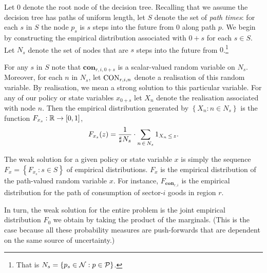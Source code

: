 \documentclass[12pt,a4paper,twoside, draft]{article}
\begin{document}
Let $\mathfrak{0}$ denote the root node of the decision tree.
Recalling that we assume the decision tree has paths of uniform length, let $S$
denote the set of \emph{path times}: for each $s$ in $S$ the node $p_s$ is $s$
steps into the future from $\mathfrak{0}$ along path $p$.
We begin by constructing the empirical distribution associated with
$\mathfrak{0} + s$ for each $s \in S$.
Let $N_s$ denote the set of nodes that are $s$ steps into the future from
$\mathfrak{0}$.\footnote{
   That is $N_{s} = \left\{ p_{s} \in \mathcal N : p \in \mathcal P\right\}$.
}

For any $s$ in $S$ note that $\mathbf{con}_{r, i, \mathfrak{0} + s}$ is a
scalar-valued random variable on $N_s$. 
Moreover, for each $n$ in $N_s$, let $\textup{CON}_{r, i, n}$ denote a
realisation of this random variable.
By realisation, we mean a strong solution to this particular variable.
For any of our policy or state variables $x_{\mathfrak{0}+s}$ let $X_n$ denote
the realisation associated with node $n$.
Then the empirical distribution generated by $\left\{X_n: n \in N_s\right\}$ is
the function
$F_{x_{s}} : \mathbb R \rightarrow [0, 1]$,
\begin{equation}\label{eq-empirical-dbn}
   F_{x_s}(z) = \frac{1}{\mathbin{\sharp}\hskip1pt N_{s}}
   \cdot \sum_{n \,\in\, N_{s}} 1_{X_n \,\leq\, z}.
\end{equation}

The weak solution for a given policy or state variable $x$ is simply the
sequence $F_{x} = \left\{F_{x_{s}}: s \in S\right\}$ of empirical distributions.
$F_{x}$ is the empirical distribution of the path-valued random variable $x$.
For instance, $F_{\mathbf{con}_{r, i}}$ is the empirical distribution for the
path of consumption of sector-$i$ goods in region $r$.

In turn, the weak solution for the entire problem is the joint empirical
distribution $F_{\mathfrak{0}}$ we obtain by taking the product of the
marginals.
(This is the case because all these probability measures are push-forwards that
are dependent on the same source of uncertainty.)
\end{document}
